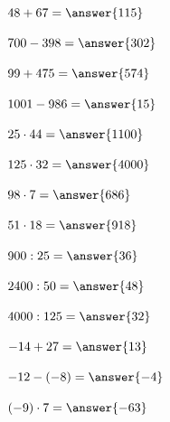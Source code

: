 \documentclass{ximera}
\begin{document}
\begin{oefening}{\oefB\ESS}

\begin{question} \(48+67=\answer{115}\) \end{question}

\begin{question} \(700-398=\answer{302}\) \end{question}

\begin{question} \(99+475=\answer{574}\) \end{question}

\begin{question} \(1001-986=\answer{15}\) \end{question}

\begin{question} \(25\cdot44=\answer{1100}\) \end{question}

\begin{question} \(125\cdot32=\answer{4000}\) \end{question}

\begin{question} \(98\cdot7=\answer{686}\) \end{question}

\begin{question} \(51\cdot18=\answer{918}\) \end{question}

\begin{question} \(900:25=\answer{36}\) \end{question}

\begin{question} \(2400:50=\answer{48}\) \end{question}

\begin{question} \(4000:125=\answer{32}\) \end{question}

\begin{question} \(-14+27=\answer{13}\) \end{question}

\begin{question} \(-12-(-8)=\answer{-4}\) \end{question}

\begin{question} \((-9)\cdot7=\answer{-63}\) \end{question}


\end{oefening}
\end{document}
